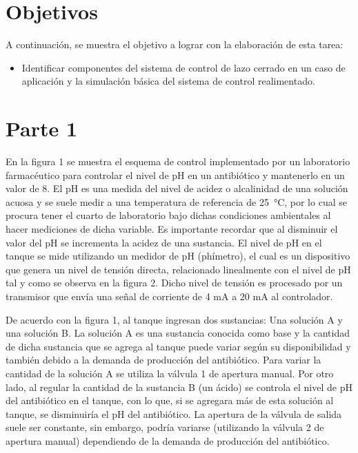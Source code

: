 \section{Objetivos}

A continuación, se muestra el objetivo a lograr con la elaboración de esta tarea:
\begin{itemize}
    \item Identificar componentes del sistema de control de lazo cerrado en un caso
de aplicación y la simulación básica del sistema de control realimentado.
\end{itemize}

\section{Parte 1}

\hspace{1.27cm} En la figura 1 se muestra el esquema de control implementado por un laboratorio farmacéutico para controlar el nivel de pH en un antibiótico y mantenerlo en un valor de 8.
El pH es una medida del nivel de acidez o alcalinidad de una solución acuosa y se suele medir a una temperatura de referencia de \SI{25}{\celsius}, por lo cual se procura tener el cuarto de laboratorio bajo dichas condiciones ambientales al hacer mediciones de dicha variable. 
Es importante recordar que al disminuir el valor del pH se incrementa la acidez de una sustancia. 
El nivel de pH en el tanque se mide utilizando un medidor de pH (phímetro), el cual es un dispositivo que genera un nivel de tensión directa, relacionado linealmente con el nivel de pH tal y como se observa en la figura 2. 
Dicho nivel de tensión es procesado por un transmisor que envía una señal de corriente de 4 mA a 20 mA al controlador.

\hspace{1.27cm} De acuerdo con la figura 1, al tanque ingresan dos sustancias: Una solución A y una solución B. 
La solución A es una sustancia conocida como base y la cantidad de dicha sustancia que se agrega al tanque puede variar según su disponibilidad y también debido a la demanda de producción del antibiótico. 
Para variar la cantidad de la solución A se utiliza la válvula 1 de apertura manual. Por otro lado, al regular la cantidad de la sustancia B (un ácido) se controla el nivel de pH del antibiótico en el tanque, con lo que, si se agregara más de esta solución al tanque, se disminuiría el pH del antibiótico. 
La apertura de la válvula de salida suele ser constante, sin embargo, podría variarse (utilizando la válvula 2 de apertura manual) dependiendo de la demanda de producción del antibiótico.

